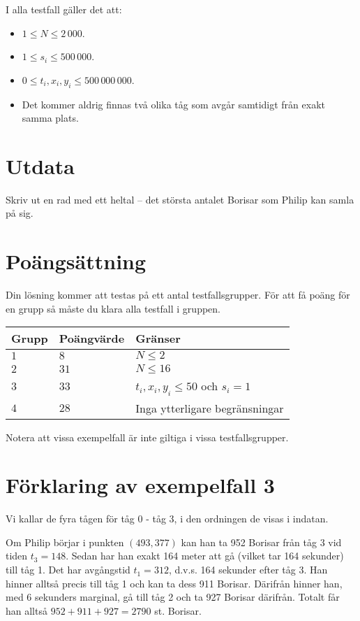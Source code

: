I alla testfall gäller det att:
\begin{itemize}
  \item $1 \le N \le 2\,000$.
  \item $1 \le s_{i} \le 500\,000$.
  \item $0 \le t_{i}, x_{i}, y_{i} \le 500\,000\,000$.
  \item Det kommer aldrig finnas två olika tåg som avgår samtidigt från exakt samma plats.
\end{itemize}

\section*{Utdata}
Skriv ut en rad med ett heltal -- det största antalet Borisar som Philip kan samla på sig.

\section*{Poängsättning}
Din lösning kommer att testas på ett antal testfallsgrupper.
För att få poäng för en grupp så måste du klara alla testfall i gruppen.

\noindent
\begin{tabular}{| l | l | l |}
  \hline
  Grupp & Poängvärde & Gränser \\ \hline
  $1$   & $8$        & $N \le 2$ \\ \hline
  $2$   & $31$       & $N \le 16$ \\ \hline
  $3$   & $33$       & $t_{i},x_{i},y_{i}\le 50$ och $s_{i} = 1$ \\ \hline
  $4$   & $28$       & Inga ytterligare begränsningar \\ \hline
\end{tabular}

Notera att vissa exempelfall är inte giltiga i vissa testfallsgrupper.

\section*{Förklaring av exempelfall 3}
Vi kallar de fyra tågen för tåg 0 - tåg 3, i den ordningen de visas i indatan.

Om Philip börjar i punkten $(493,377)$ kan han ta 952 Borisar från tåg 3 vid tiden $t_{3}=148$. Sedan har han exakt 164 meter att gå (vilket tar 164 sekunder) till tåg 1. Det har avgångstid $t_{1}=312$, d.v.s. 164 sekunder efter tåg 3. 
Han hinner alltså precis till tåg 1 och kan ta dess 911 Borisar. Därifrån hinner han, med 6 sekunders marginal, gå till tåg 2 och ta 927 Borisar därifrån. Totalt får han alltså $952+911+927=2790$ st. Borisar. 